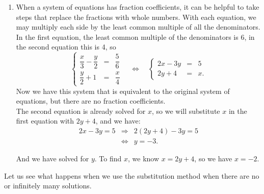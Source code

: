 \begin{example}
\begin{enumerate}
\item When a system of equations has fraction coefficients, it can be helpful to take steps that replace the fractions with whole numbers. With each equation, we may multiply each side by the least common multiple of all the denominators. In the first equation, the least common multiple of the denominators is 6, in the second equation this is 4, so
\[ \left\{ \begin{array}{rcl} \dfrac{x}{3}-\dfrac{y}{2} &=& \dfrac{5}{6} \\[0.4cm] \dfrac{y}{2} + 1  &=& \dfrac{x}{4}   \end{array} \right. \quad  \Leftrightarrow \quad \left\{ \begin{array}{rcl} 2x-3y & = & 5 \\[0.2cm] 2y+4 & = & x.  \end{array} \right.  \]
Now we have this system that is equivalent to the original system of equations, but there are no fraction coefficients. \\
The second equation is already solved for $x$, so we will substitute $x$ in the first equation with $2y+4$, and we have:
\begin{eqnarray*}
	2x-3y=5 &\Rightarrow & 2(2y+4)-3y=5  \\ 
	&\Leftrightarrow & y=-3. 
\end{eqnarray*}

And we have solved for $y$. To find $x$, we know $x=2y+4$, so we have $x=-2$.
\end{enumerate}
\end{example}


Let us see what happens when we use the substitution method when there are no or infinitely many solutions.

